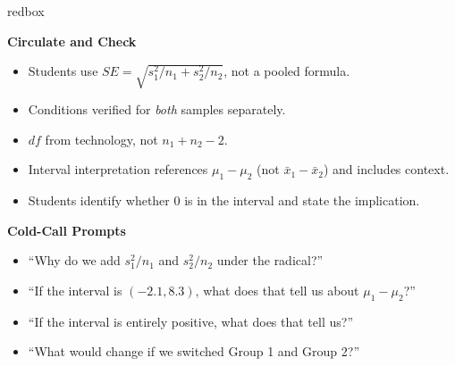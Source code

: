 \documentclass[10pt]{article}
\begin{document}
\begin{skillbox}{redbox}
\begin{minipage}[t]{0.48\linewidth}
    \textbf{Circulate and Check}
    \begin{itemize}
        \item Students use $SE = \sqrt{s_1^2/n_1 + s_2^2/n_2}$, not a pooled formula.
        \item Conditions verified for \emph{both} samples separately.
        \item $df$ from technology, not $n_1 + n_2 - 2$.
        \item Interval interpretation references $\mu_1 - \mu_2$ (not $\bar x_1 - \bar x_2$)
              and includes context.
        \item Students identify whether 0 is in the interval and state the implication.
    \end{itemize}
\end{minipage}
\hfill
\begin{minipage}[t]{0.48\linewidth}
    \textbf{Cold-Call Prompts}
    \begin{itemize}
        \item ``Why do we add $s_1^2/n_1$ and $s_2^2/n_2$ under the radical?''
        \item ``If the interval is $(−2.1, 8.3)$, what does that tell us about $\mu_1 - \mu_2$?''
        \item ``If the interval is entirely positive, what does that tell us?''
        \item ``What would change if we switched Group 1 and Group 2?''
    \end{itemize}
\end{minipage}
\end{skillbox}
\end{document}
